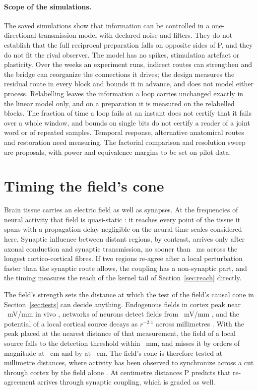 \documentclass[12pt]{article}
\begin{document}
\paragraph{Scope of the simulations.} The saved simulations show that information
can be controlled in a one-directional transmission model with declared noise
and filters. They do not establish that the full reciprocal preparation falls
on opposite sides of P, and they do not fit the rival observer. The model has
no spikes, stimulation artefact or plasticity. Over the weeks an experiment
runs, indirect routes can strengthen and the bridge can reorganize the
connections it drives; the design measures the residual route in every block
and bounds it in advance, and does not model either process. Relabelling
leaves the information a loop carries unchanged exactly in the linear model
only, and on a preparation it is measured on the relabelled blocks. The fraction of time a loop
fails at an instant does not certify that it fails over a whole window, and
bounds on single bits do not certify a reader of a joint word or of repeated
samples. Temporal response, alternative anatomical routes and restoration need
measuring. The factorial comparison and resolution sweep are proposals, with
power and equivalence margins to be set on pilot data.

\section{Timing the field's cone}
\label{app:field}

Brain tissue carries an electric field as
well as synapses. At the frequencies of neural activity that field is
quasi-static \citep{gratiy2017}: it reaches every point of the tissue it spans
with a propagation delay negligible on the neural time scales considered here. Synaptic influence between distant regions, by
contrast, arrives only after axonal conduction and synaptic transmission, no
sooner than \ueConeMaxMs{}~ms across the longest cortico-cortical fibres. If two
regions re-agree after a local perturbation faster than the synaptic route
allows, the coupling has a non-synaptic part, and the timing measures the reach
of the kernel tail of Section~\ref{sec:reach} directly.

The field's strength sets the distance at which the test of the field's causal
cone in Section~\ref{sec:tests} can decide anything.
Endogenous fields in cortex peak near \ueFieldPeak{}~mV/mm in vivo
\citep{frohlich2010}, networks of neurons detect fields from
\ueFieldDetection{}~mV/mm \citep{francis2003}, and the potential of a local
cortical source decays as $r^{-2.1}$ across millimetres \citep{rebollo2021}.
With the peak placed at the nearest distance of that measurement, the field of a
local source falls to the detection threshold within \ueFieldReachMm{}~mm, and
misses it by \ueFieldDeficitOrders{} orders of magnitude at \ueFibreCm{}~cm and
by \ueFieldDeficitLocalOrders{} at \ueLocalCm{}~cm.
The field's cone is therefore tested at millimetre distances, where activity
has been observed to synchronize across a cut through cortex by the field alone
\citep{rebollo2021}. At centimetre distances P predicts that re-agreement
arrives through synaptic coupling, which is graded as well.
\end{document}
